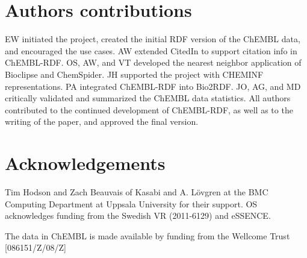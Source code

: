 \documentclass[10pt]{bmc_article}
\newenvironment{bmcformat}{\begin{raggedright}\baselineskip20pt\sloppy\setboolean{publ}{false}}{\end{raggedright}\baselineskip20pt\sloppy}
\begin{document}
\begin{bmcformat}
\section*{Authors contributions}
EW initiated the project, created the initial RDF version of the ChEMBL data, and encouraged the use cases.
AW extended CitedIn to support citation info in ChEMBL-RDF.
OS, AW, and VT developed the nearest neighbor application of Bioclipse and ChemSpider.
JH supported the project with CHEMINF representations.
PA integrated ChEMBL-RDF into Bio2RDF.
JO, AG, and MD critically validated and summarized the ChEMBL data statistics.
All authors contributed to the continued development of ChEMBL-RDF, as well as to the writing of the paper,
and approved the final version.

\section*{Acknowledgements}

Tim Hodson and Zach Beauvais of Kasabi and A. L\"ovgren at the BMC Computing Department at Uppsala University for their
support. OS acknowledges funding from the Swedish VR (2011-6129) and eSSENCE.

The data in ChEMBL is made available by funding from the Wellcome Trust [086151/Z/08/Z]

{
\printbibliography
}



\end{bmcformat}
\end{document}
